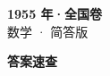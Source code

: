 \documentclass[zihao=-4, a4paper]{ctexart}
\begin{document}
\begin{center}
  {\Large\bfseries 1955 年·全国卷}\\[4pt]
  {\large 数学 · 简答版}
\end{center}
\medskip
{}

\clearpage
{}
\begin{center}{\Large\bfseries 答案速查}\end{center}
\medskip

\end{document}
